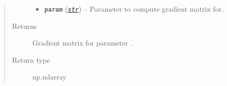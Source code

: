 \documentclass[letterpaper,10pt,english]{sphinxmanual}
\begin{document}
\begin{fulllineitems}
\begin{fulllineitems}
\begin{quote}
\begin{description}
\begin{itemize}
\item {} 
\textbf{\texttt{param}} (\href{https://docs.python.org/2/library/functions.html\#str}{\emph{\texttt{str}}}) -- Parameter to compute gradient matrix for.

\end{itemize}

\item[{Returns}] \leavevmode
Gradient matrix for parameter .

\item[{Return type}] \leavevmode
np.ndarray

\end{description}\end{quote}

\end{fulllineitems}


\end{fulllineitems}

\end{document}
